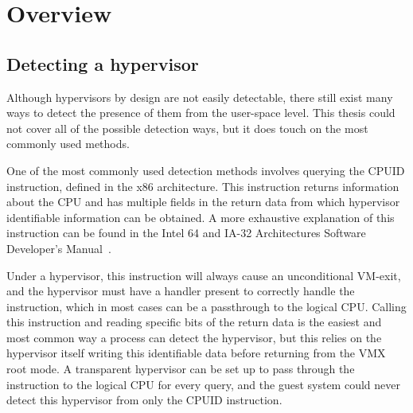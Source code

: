 \section{Overview}\label{s:overview}

\subsection{Detecting a hypervisor}\label{HV_detection}

Although hypervisors by design are not easily detectable, there still exist many ways to detect the presence of them from the user-space level. 
This thesis could not cover all of the possible detection ways, but it does touch on the most commonly used methods.

One of the most commonly used detection methods involves querying the CPUID instruction, defined in the x86 architecture. 
This instruction returns information about the CPU and has multiple fields in the return data from which hypervisor identifiable information can be obtained. 
A more exhaustive explanation of this instruction can be found in the Intel\textsuperscript{\tiny\textregistered} 64 and IA-32 Architectures Software Developer's Manual~\cite[Volume~2A]{Intel-SDM2025}. 

Under a hypervisor, this instruction will always cause an unconditional VM-exit, and the hypervisor must have a handler present to correctly handle the instruction, 
which in most cases can be a passthrough to the logical CPU. Calling this instruction and reading specific bits of the return data is the easiest 
and most common way a process can detect the hypervisor, but this relies on the hypervisor itself writing this identifiable data before returning from the VMX root mode. 
A transparent hypervisor can be set up to pass through the instruction to the logical CPU for every query, and the guest system could never detect this hypervisor from only the CPUID instruction.

